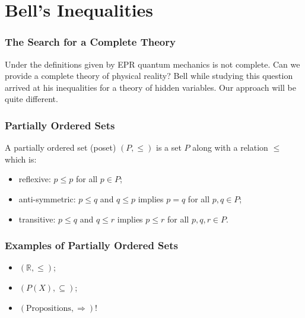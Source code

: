 \documentclass{beamer}
\begin{document}
\section{Bell's Inequalities}

\begin{frame}

	\frametitle{The Search for a Complete Theory}
	
	Under the definitions given by EPR quantum mechanics is not complete. Can we provide a complete theory of physical reality? Bell while studying this question arrived at his inequalities for a theory of hidden variables\cite{Bell1964}. Our approach will be quite different.

\end{frame}
	
\begin{frame}

	\frametitle{Partially Ordered Sets}
	
	\begin{definition}
	
		A partially ordered set (poset) $(P,\leq)$ is a set $P$ along with a relation $\leq$ which is:
		\begin{itemize}
		
			\item reflexive: $p\leq p$ for all $p\in P$;
			\item anti-symmetric: $p\leq q$ and $q\leq p$ implies $p=q$ for all $p,q\in P$;
			\item transitive: $p\leq q$ and $q\leq r$ implies $p\leq r$ for all $p,q,r\in P$.   		
		
		\end{itemize}			
	
	\end{definition}

\end{frame}	
	
\begin{frame}

	\frametitle{Examples of Partially Ordered Sets}

	\begin{example}	
	
		\begin{itemize}
	
			\item $(\mathbb{R},\leq)$;
			\item $(P(X),\subseteq)$;
			\item $(\text{Propositions},\Rightarrow)$!	
	
		\end{itemize}

	\end{example}

\end{frame}	
\end{document}
